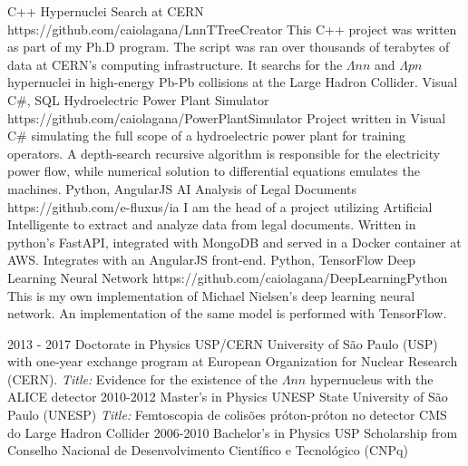 \documentclass[9pt]{developercv} %
\begin{document}

\vspace{10 pt}
\begin{entrylist}
	\entry
		{C++}
		{Hypernuclei Search at CERN}
		{https://github.com/caiolagana/LnnTTreeCreator}
		{This C++ project was written as part of my Ph.D program. The script was ran over thousands of terabytes of data at CERN's computing infrastructure. It searchs for the $\Lambda nn$ and $\Lambda pn$ hypernuclei in high-energy Pb-Pb collisions at the Large Hadron Collider.}
    \entry
		{Visual C\#, SQL}
		{Hydroelectric Power Plant Simulator}
		{https://github.com/caiolagana/PowerPlantSimulator}
		{Project written in Visual C\# simulating the full scope of a hydroelectric power plant for training operators. A depth-search recursive algorithm is responsible for the electricity power flow, while numerical solution to differential equations emulates the machines.}
    \entry
		{Python, AngularJS}
		{AI Analysis of Legal Documents}
		{https://github.com/e-fluxus/ia}
		{I am the head of a project utilizing Artificial Intelligente to extract and analyze data from legal documents. Written in python's FastAPI, integrated with MongoDB and served in a Docker container at AWS. Integrates with an AngularJS front-end.}
	\entry
		{Python, TensorFlow}
		{Deep Learning Neural Network}
		{https://github.com/caiolagana/DeepLearningPython}
		{This is my own implementation of Michael Nielsen's deep learning neural network. An implementation of the same model is performed with TensorFlow.}
\end{entrylist}


\vspace{-10 pt}
\begin{entrylist}
    \entry
		{2013 - 2017}
		{Doctorate in Physics}
		{USP/CERN}
		{University of São Paulo (USP) with one-year exchange program at European Organization for Nuclear Research (CERN). {\it Title:} Evidence for the existence of the $\Lambda nn$ hypernucleus with the ALICE detector}
    \entry
		{2010-2012}
		{Master's in Physics}
		{UNESP}
		{State University of São Paulo (UNESP) {\it Title:} Femtoscopia de colisões próton-próton no detector CMS do Large Hadron Collider}
	\entry
		{2006-2010}
		{Bachelor's in Physics}
		{USP}
		{Scholarship from Conselho Nacional de Desenvolvimento Científico e Tecnológico (CNPq)}
\end{entrylist}
\end{document}
